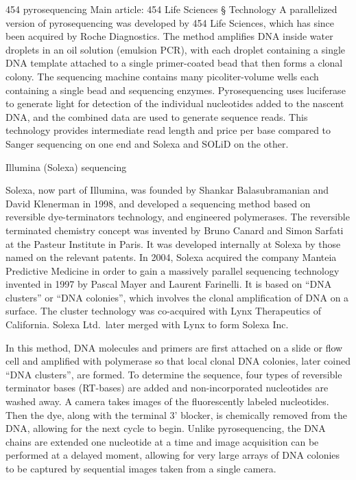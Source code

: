 454 pyrosequencing
Main article: 454 Life Sciences § Technology
A parallelized version of pyrosequencing was developed by 454 Life Sciences, which has since been acquired by Roche Diagnostics. The method amplifies DNA inside water droplets in an oil solution (emulsion PCR), with each droplet containing a single DNA template attached to a single primer-coated bead that then forms a clonal colony. The sequencing machine contains many picoliter-volume wells each containing a single bead and sequencing enzymes. Pyrosequencing uses luciferase to generate light for detection of the individual nucleotides added to the nascent DNA, and the combined data are used to generate sequence reads. This technology provides intermediate read length and price per base compared to Sanger sequencing on one end and Solexa and SOLiD on the other.

Illumina (Solexa) sequencing

Solexa, now part of Illumina, was founded by Shankar Balasubramanian and David Klenerman in 1998, and developed a sequencing method based on reversible dye-terminators technology, and engineered polymerases. The reversible terminated chemistry concept was invented by Bruno Canard and Simon Sarfati at the Pasteur Institute in Paris. It was developed internally at Solexa by those named on the relevant patents. In 2004, Solexa acquired the company Manteia Predictive Medicine in order to gain a massively parallel sequencing technology invented in 1997 by Pascal Mayer and Laurent Farinelli. It is based on ``DNA clusters'' or ``DNA colonies'', which involves the clonal amplification of DNA on a surface. The cluster technology was co-acquired with Lynx Therapeutics of California. Solexa Ltd.~later merged with Lynx to form Solexa Inc.

In this method, DNA molecules and primers are first attached on a slide or flow cell and amplified with polymerase so that local clonal DNA colonies, later coined ``DNA clusters'', are formed. To determine the sequence, four types of reversible terminator bases (RT-bases) are added and non-incorporated nucleotides are washed away. A camera takes images of the fluorescently labeled nucleotides. Then the dye, along with the terminal 3' blocker, is chemically removed from the DNA, allowing for the next cycle to begin. Unlike pyrosequencing, the DNA chains are extended one nucleotide at a time and image acquisition can be performed at a delayed moment, allowing for very large arrays of DNA colonies to be captured by sequential images taken from a single camera.

